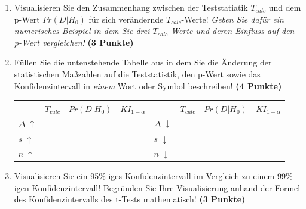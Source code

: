 \documentclass[a4paper, 9pt]{scrartcl}\usepackage[]{graphicx}\usepackage[]{xcolor}
\begin{document}
\begin{enumerate}
\item Visualisieren Sie den Zusammenhang zwischen der Teststatiatik
  $T_{calc}$ und dem p-Wert $Pr(D|H_0)$ f{\"u}r sich ver{\"a}ndernde $T_{calc}$-Werte!
  \textit{Geben Sie daf{\"u}r ein numerisches Beispiel in dem Sie drei
    $T_{calc}$-Werte und deren Einfluss auf den p-Wert vergleichen!}
  \textbf{(3 Punkte)}  
\item  F{\"u}llen Sie die untenstehende Tabelle aus in dem Sie die {\"A}nderung der
  statistischen Ma{\ss}zahlen auf die Teststatistik, den p-Wert sowie das
  Konfidenzintervall in \textit{einem} Wort oder Symbol beschreiben! \textbf{(4 Punkte)}
\begin{center}
  \large
  \begin{tabular}[c]{l|c|c|c|l|c|c|c}
    & $T_{calc}$ & $Pr(D|H_0)$ & $KI_{1-\alpha}$ & & $T_{calc}$ & $Pr(D|H_0)$ & $KI_{1-\alpha}$\strut\\ 
    \hline
    \textbf{$\Delta\; \uparrow$} & \hspace{1.8cm} & \hspace{1.8cm}  & \hspace{1.8cm} & \textbf{
                                                          $\Delta\; \downarrow$} &
                                                                          \hspace{1.8cm} & \hspace{1.8cm}  & \hspace{1.8cm}\strut\\
    \hline
        \textbf{$s\; \uparrow$} & \hspace{1.8cm} & \hspace{1.8cm}  & \hspace{1.8cm} & \textbf{
                                                          $s\; \downarrow$} &
                                                                          \hspace{1.8cm}
                                                & \hspace{1.8cm}  & \hspace{1.8cm}\strut\\
    \hline
        \textbf{$n\; \uparrow$} & \hspace{1.8cm} & \hspace{1.8cm}  & \hspace{1.8cm} & \textbf{
                                                          $n\; \downarrow$} &
                                                                          \hspace{1.8cm}
                                                & \hspace{1.8cm}  & \hspace{1.8cm}\strut\\
    \hline
  \end{tabular}
\end{center}
\item Visualisieren Sie ein 95\%-iges Konfidenzintervall im Vergleich
  zu einem 99\%-igen Konfidenzintervall! Begr{\"u}nden Sie Ihre Visualisierung anhand der Formel
  des Konfidenzintervalls des t-Tests mathematisch! \textbf{(3 Punkte)} 
\end{enumerate} 
\end{document}
